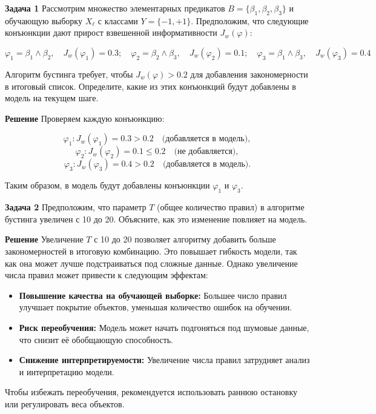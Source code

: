 \textbf{Задача 1}  
Рассмотрим множество элементарных предикатов \( B = \{ \beta_1, \beta_2, \beta_3 \} \) и обучающую выборку \( X_\ell \) с классами \( Y = \{-1, +1\} \). Предположим, что следующие конъюнкции дают прирост взвешенной информативности \( J_w(\varphi) \):

\[
\varphi_1 = \beta_1 \wedge \beta_2, \quad J_w(\varphi_1) = 0.3; \quad
\varphi_2 = \beta_2 \wedge \beta_3, \quad J_w(\varphi_2) = 0.1; \quad
\varphi_3 = \beta_1 \wedge \beta_3, \quad J_w(\varphi_3) = 0.4
\]

Алгоритм бустинга требует, чтобы \( J_w(\varphi) > 0.2 \) для добавления закономерности в итоговый список. Определите, какие из этих конъюнкций будут добавлены в модель на текущем шаге.  

\textbf{Решение}  
Проверяем каждую конъюнкцию:  

\[
\varphi_1: J_w(\varphi_1) = 0.3 > 0.2 \quad \text{(добавляется в модель)},
\]
\[
\varphi_2: J_w(\varphi_2) = 0.1 \leq 0.2 \quad \text{(не добавляется)},
\]
\[
\varphi_3: J_w(\varphi_3) = 0.4 > 0.2 \quad \text{(добавляется в модель)}.
\]

Таким образом, в модель будут добавлены конъюнкции \( \varphi_1 \) и \( \varphi_3 \).

\vspace{0.5cm}

\textbf{Задача 2}  
Предположим, что параметр \( T \) (общее количество правил) в алгоритме бустинга увеличен с 10 до 20. Объясните, как это изменение повлияет на модель.  

\textbf{Решение}  
Увеличение \( T \) с 10 до 20 позволяет алгоритму добавить больше закономерностей в итоговую комбинацию. Это повышает гибкость модели, так как она может лучше подстраиваться под сложные данные. Однако увеличение числа правил может привести к следующим эффектам:
\begin{itemize}
    \item \textbf{Повышение качества на обучающей выборке:} Большее число правил улучшает покрытие объектов, уменьшая количество ошибок на обучении.  
    \item \textbf{Риск переобучения:} Модель может начать подгоняться под шумовые данные, что снизит её обобщающую способность.  
    \item \textbf{Снижение интерпретируемости:} Увеличение числа правил затрудняет анализ и интерпретацию модели.
\end{itemize}

Чтобы избежать переобучения, рекомендуется использовать раннюю остановку или регулировать веса объектов.  

